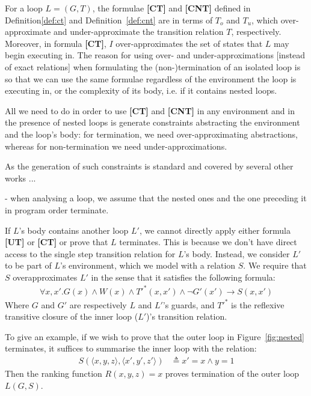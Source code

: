 \documentclass[preprint]{sigplanconf}
\theoremstyle{definition}
\begin{document}
For a loop $L=(G,T)$, the formulae {\bf [CT]} and {\bf [CNT]} defined in Definition\ref{def:ct} and Definition~\ref{def:cnt} are in terms of 
$T_o$ and $T_u$, which over-approximate and under-approximate the transition relation $T$, respectively. Moreover, in formula {\bf [CT]},  
$I$ over-approximates the set of states that $L$ may begin executing in.
The reason for using over- and under-approximations [instead of exact relations] when formulating the (non-)termination of an isolated loop 
is so that we can use the same formulae regardless of the environment the loop is executing in, or 
the complexity of its body, i.e. if it contains nested loops.

All we need to do in order to use {\bf [CT]} and {\bf [CNT]} in any environment and in the presence of nested loops is generate constraints abstracting 
the environment and the loop's body: for termination, we need over-approximating abstractions, whereas for non-termination 
we need under-approximations. 

As the generation of such constraints is standard and covered by several other works \cite{DBLP:conf/pldi/GrebenshchikovLPR12,DBLP:conf/pldi/GulwaniSV08}...

- when analysing a loop, we assume that the nested ones and the one preceding it in program order terminate.



If $L$'s body contains another loop $L'$, we cannot directly apply either formula {\bf [UT]} or
{\bf [CT]} or prove that $L$ terminates.  This is because we don't have direct access to the
single step transition relation for $L$'s body.  Instead, we consider $L'$ to be part of
$L$'s environment, which we model with a relation $S$.  We require that $S$ overapproximates
$L'$ in the sense that it satisfies the following formula:
\begin{align*}
 \forall x, x'. G(x) \wedge W(x) \wedge T'^*(x, x') \wedge \lnot G'(x') \rightarrow S(x, x')
\end{align*}
Where $G$ and $G'$ are respectively $L$ and $L'$'s guards, and $T'^*$ is the reflexive transitive closure of
the inner loop ($L'$)'s transition relation.

To give an example, if we wish to prove that the outer loop in Figure~\ref{fig:nested} terminates,
it suffices to summarise the inner loop with the relation:
\begin{align*}
S(\langle x, y, z \rangle, \langle x', y', z' \rangle) & \triangleq x' = x \wedge y = 1
\end{align*}
Then the ranking function $R(x, y, z) = x$ proves termination of the outer loop $L(G, S)$.\\
\end{document}
